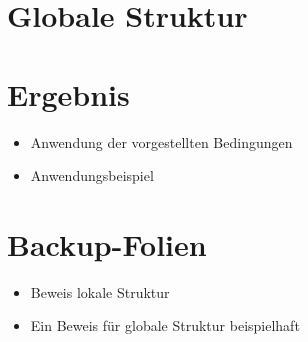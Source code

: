 \documentclass{beamer}
\begin{document}
	\section{Globale Struktur}
	
	\section{Ergebnis}
	\begin{frame}
		\begin{itemize}
			\item Anwendung der vorgestellten Bedingungen
			\item Anwendungsbeispiel
		\end{itemize}
	\end{frame}

	\section{Backup-Folien}
	\begin{frame}
		\begin{itemize}
			\item Beweis lokale Struktur
			\item Ein Beweis für globale Struktur beispielhaft
		\end{itemize}
	\end{frame}
\end{document}
